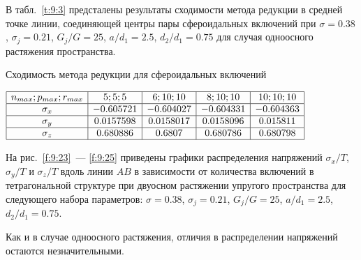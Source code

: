В табл.~\ref{t:9:3} предсталены результаты сходимости метода редукции в средней точке линии, соединяющей центры пары сфероидальных включений при $\sigma=0.38$, $\sigma_j=0.21$, $G_j/G=25$, $a/d_1=2.5$, $d_2/d_1=0.75$ для случая одноосного растяжения пространства.

\begin{table}[h!]
\caption{Сходимость метода редукции для сфероидальных включений}
\centering
$
\begin{array}{|c|c|c|c|c|}
\hline
n_{max}; p_{max}; r_{max} & 5; 5; 5 & 6; 10; 10 & 8; 10; 10 & 10; 10; 10 \\
\hline
\sigma_x & -0.605721		& -0.604027 	& -0.604331 		& -0.604363 \\
\hline
\sigma_y & 0.0157598 		& 0.0158017 	& 0.0158096 	& 0.015811 \\
\hline
\sigma_z & 0.680886 		& 0.6807 		& 0.680786 		& 0.680798 \\
\hline
\end{array}
$
\label{t:9:3}
\end{table}

На рис.~\ref{f:9:23}~--- \ref{f:9:25} приведены графики распределения напряжений $\sigma_x/T$, $\sigma_y/T$ и $\sigma_z/T$ вдоль линии $AB$ в зависимости от количества включений в тетрагональной структуре при двуосном растяжении упругого пространства для следующего набора параметров: $\sigma=0.38$, $\sigma_j=0.21$, $G_j/G=25$, $a/d_1=2.5$, $d_2/d_1=0.75$.

Как и в случае одноосного растяжения, отличия в распределении напряжений остаются незначительными.



